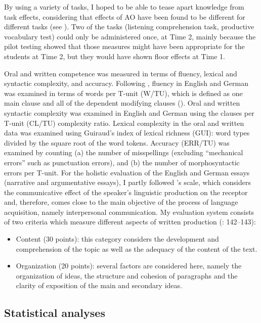 \documentclass[output=paper,modfonts,nonflat,newtxmath]{langsci/langscibook}
\begin{document}
By using a variety of tasks, I hoped to be able to tease apart knowledge from task effects, considering that effects of AO have been found to be different for different tasks (see \citealt{Pfenninger2017}). Two of the tasks (listening comprehension task, productive vocabulary test) could only be administered once, at Time 2, mainly because the pilot testing showed that those measures might have been appropriate for the students at Time 2, but they would have shown floor effects at Time 1.


Oral and written competence was measured in terms of fluency, lexical and syntactic complexity, and accuracy. Following \citet{Wolfe-QuinteroEtAl1998}, fluency in English and German was examined in terms of words per T-unit (W/TU), which is defined as one main clause and all of the dependent modifying clauses (\citealt{EllisBarkhuizen2005}). Oral and written syntactic complexity was examined in English and German using the clauses per T-unit (CL/TU) complexity ratio. Lexical complexity in the oral and written data was examined using Guiraud’s index of lexical richness (GUI): word types divided by the square root of the word tokens. Accuracy (ERR/TU) was examined by counting (a) the number of misspellings (excluding ``mechanical errors'' such as punctuation errors), and (b) the number of morphosyntactic errors per T-unit. For the holistic evaluation of the English and German essays (narrative and argumentative essays), I partly followed \citealt{JacobsEtAl1981}'s scale, which considers the communicative effect of the speaker’s linguistic production on the receptor and, therefore, comes close to the main objective of the process of language acquisition, namely interpersonal communication. My evaluation system consists of two criteria which measure different aspects of written production (\citealt{LasagabasterEtAl2003}: 142--143):


\begin{itemize}
\item
Content (30 points): this category considers the development and comprehension of the topic as well as the adequacy of the content of the text.

\item
Organization (20 points): several factors are considered here, namely the organization of ideas, the structure and cohesion of paragraphs and the clarity of exposition of the main and secondary ideas.

\end{itemize}

\subsection{Statistical analyses}
\end{document}
